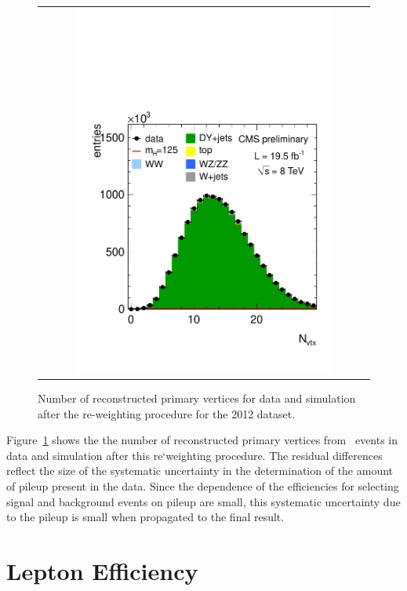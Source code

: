 \begin{figure}[htp] 
\centering 
\begin{tabular}{c} 
\includegraphics[width=0.8\textwidth]{figures/nvtx.pdf} 
\end{tabular} 
\caption{Number of reconstructed primary vertices for data and simulation 
after the re-weighting procedure for the 2012 dataset.}
\label{fig:nvtx} 
\end{figure} 

Figure~\ref{fig:nvtx} shows the the number of reconstructed primary vertices 
from \dyll\ events in data and simulation after this re`weighting procedure. 
The residual differences reflect the size of the systematic uncertainty in the 
determination of the amount of pileup present in the data. 
Since the dependence of the efficiencies for selecting signal and background events 
on pileup are small, this systematic uncertainty due to the pileup is small when 
propagated to the final result.

\section{Lepton Efficiency}


